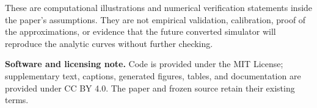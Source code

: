 \documentclass[11pt]{article}
\begin{document}
These are computational illustrations and numerical verification statements inside the paper's assumptions. They are not empirical validation, calibration, proof of the approximations, or evidence that the future converted simulator will reproduce the analytic curves without further checking.

\medskip
\noindent\textbf{Software and licensing note.} Code is provided under the MIT License; supplementary text, captions, generated figures, tables, and documentation are provided under CC BY 4.0. The paper and frozen source retain their existing terms.
\end{document}
